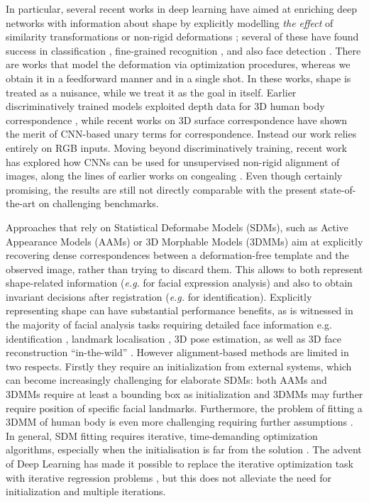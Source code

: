 In particular, several recent works in deep learning have aimed at enriching deep networks with information about shape by explicitly modelling {\em the effect} of  similarity transformations \cite{PapandreouKS15}
or non-rigid deformations \cite{JaderbergSZK15,HandaBPSMD16,ChenHW016}; several of these have found success in classification \cite{PapandreouKS15}, fine-grained recognition  \cite{JaderbergSZK15}, and also face detection \cite{ChenHW016}. There are works \cite{lades1993distortion,pedersoli2015elastic} that model the deformation via optimization procedures, whereas we obtain it in a feedforward manner and in a single shot. In these works, shape is treated as a nuisance, while we treat it as the goal in itself. 
Earlier discriminatively trained models exploited depth data for 3D human body correspondence \cite{TaylorSSF12,WeiHCVL15}, while recent works on 3D surface correspondence \cite{Br1,Br2} have shown the merit of CNN-based unary terms for correspondence. Instead our work relies entirely on RGB inputs.
Moving beyond discriminatively training, recent work \cite{ThewlisBV17a}  has explored how CNNs can be used for unsupervised non-rigid alignment of images, along the lines of earlier works on congealing \cite{Learned-Miller06,KokkinosY07}. Even though certainly promising, the results are still not directly comparable with the present state-of-the-art on challenging benchmarks.

Approaches that rely on  Statistical Deformabe Models (SDMs), such as Active Appearance Models (AAMs) or 3D Morphable Models (3DMMs) aim at explicitly recovering  dense correspondences between a deformation-free template and the observed image, rather than trying to discard them. 
This allows to both represent shape-related information (\textit{e.g.} for facial expression analysis) and also to obtain invariant decisions after registration (\textit{e.g.} for identification). 
Explicitly representing shape  can have substantial performance benefits, as is witnessed in the majority of facial analysis tasks requiring detailed face information e.g. identification \cite{TaigmanYRW14}, landmark localisation \cite{sagonas2016300}, 3D pose estimation, as well as 3D face reconstruction ``in-the-wild'' \cite{jourabloo2016large}. 
However alignment-based methods are limited in two respects. Firstly they require an initialization from external systems, which can become increasingly challenging for elaborate SDMs: both AAMs and 3DMMs require at least a bounding box as initialization and 3DMMs may further require position of specific facial landmarks. Furthermore, the problem of fitting a 3DMM of human body is even more challenging requiring further assumptions \cite{lassner2017unite}. In general, SDM fitting  requires iterative, time-demanding optimization algorithms, especially when the initialisation is far from the solution \cite{booth20173d}. The advent of Deep Learning has made it possible to replace the iterative optimization task with iterative regression problems \cite{trigeorgis2016mnemonic}, but this does not alleviate the need for initialization and multiple iterations. 

